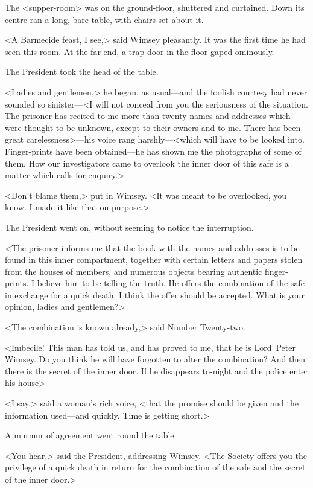 The <supper-room> was on the ground-floor, shuttered and curtained. Down its centre ran a long, bare table, with chairs set about it.

<A Barmecide feast, I see,> said Wimsey pleasantly. It was the first time he had seen this room. At the far end, a trap-door in the floor gaped ominously.

The President took the head of the table.

<Ladies and gentlemen,> he began, as usual—and the foolish courtesy had never sounded so sinister—<I will not conceal from you the seriousness of the situation. The prisoner has recited to me more than twenty names and addresses which were thought to be unknown, except to their owners and to me. There has been great carelessness>—his voice rang harshly—<which will have to be looked into. Finger-prints have been obtained—he has shown me the photographs of some of them. How our investigators came to overlook the inner door of this safe is a matter which calls for enquiry.>

<Don't blame them,> put in Wimsey. <It was meant to be overlooked, you know. I made it like that on purpose.>

The President went on, without seeming to notice the interruption.

<The prisoner informs me that the book with the names and addresses is to be found in this inner compartment, together with certain letters and papers stolen from the houses of members, and numerous objects bearing authentic finger-prints. I believe him to be telling the truth. He offers the combination of the safe in exchange for a quick death. I think the offer should be accepted. What is your opinion, ladies and gentlemen?>

<The combination is known already,> said Number Twenty-two.

<Imbecile! This man has told us, and has proved to me, that he is Lord~Peter Wimsey. Do you think he will have forgotten to alter the combination? And then there is the secret of the inner door. If he disappears to-night and the police enter his house\longdash>

<I say,> said a woman's rich voice, <that the promise should be given and the information used—and quickly. Time is getting short.>

A murmur of agreement went round the table.

<You hear,> said the President, addressing Wimsey. <The Society offers you the privilege of a quick death in return for the combination of the safe and the secret of the inner door.>

